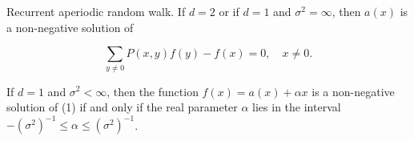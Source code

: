 Recurrent aperiodic random walk. If $d = 2$ or if $d = 1$ and $\sigma^2 = \infty$, then $a(x)$ is a non-negative solution of

$$\sum_{y \neq 0} P(x,y)f(y) - f(x) = 0, \quad x \neq 0.$$

If $d = 1$ and $\sigma^2 < \infty$, then the function $f(x) = a(x) + \alpha x$ is a non-negative solution of (1) if and only if the real parameter $\alpha$ lies in the interval $-(\sigma^2)^{-1} \leq \alpha \leq (\sigma^2)^{-1}$.